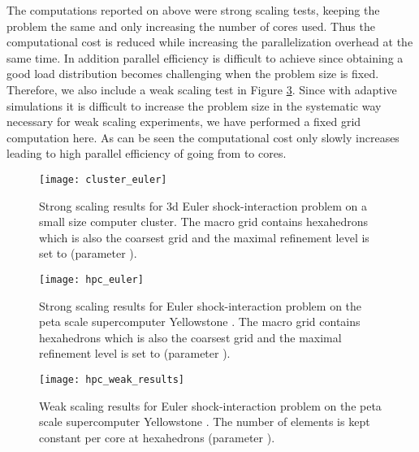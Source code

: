 \documentclass[10pt,notitlepage,a4paper]{article}
\begin{document}
The computations reported on above were strong scaling tests, keeping the
problem the same and only increasing the number of cores used. Thus the
computational cost is reduced while increasing the parallelization overhead at the
same time. In addition parallel efficiency is difficult to achieve since 
obtaining a good load distribution becomes challenging when the problem size is fixed. 
Therefore, we also include a weak scaling test in Figure \ref{fig:speedup_weak_hpc}.
Since with adaptive simulations it is difficult to increase the  problem size
in the systematic way necessary for weak scaling experiments, we have
performed a fixed grid computation here.
As can be seen the
computational cost only slowly increases leading to high parallel
efficiency of  going from  to  cores. 

\begin{figure}[!ht]
\begin{center}
  \texttt{[image: cluster\_euler]}
  \caption{Strong scaling results for 3d Euler shock-interaction problem on a small size
  computer cluster. The macro grid contains  hexahedrons which is also the
  coarsest grid and the maximal refinement level is set to  (parameter ).}
  \label{fig:speedup_strong_cluster3d}
\end{center}
\end{figure}  

\begin{figure}[!ht]
\begin{center}
  \texttt{[image: hpc\_euler]}
  \caption{Strong scaling results for Euler shock-interaction problem on the peta scale
  supercomputer Yellowstone \cite{Yellowstone}. 
  The macro grid contains  hexahedrons which is also the 
    coarsest grid and the maximal refinement level is set to  (parameter ).}
  \label{fig:speedup_strong_hpc}
\end{center}
\end{figure}  

\begin{figure}[!ht]
\begin{center}
  \texttt{[image: hpc\_weak\_results]}
  \caption{Weak scaling results for Euler shock-interaction problem on the peta scale
    supercomputer Yellowstone \cite{Yellowstone}. The number of elements is kept
    constant per core at  hexahedrons (parameter ).}
  \label{fig:speedup_weak_hpc}
\end{center}
\end{figure}  
\end{document}
